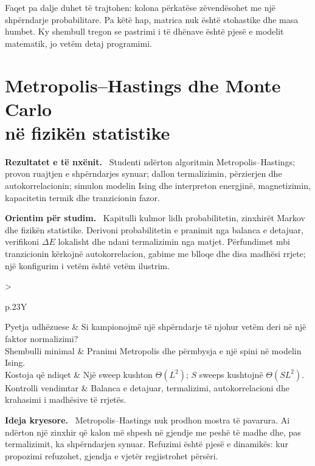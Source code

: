 \documentclass[11pt,oneside,openany]{book}
\newenvironment{qellime}{\par\medskip\noindent\textbf{Rezultatet e të nxënit.}\ }{\par\medskip}
\newenvironment{orientim}{\par\medskip\noindent\textbf{Orientim për studim.}\ }{\par\medskip}
\newenvironment{ideja}{\par\medskip\noindent\textbf{Ideja kryesore.}\ }{\par\medskip}
\newcommand{\hartakapitullit}[4]{%
\par\smallskip
\noindent\begin{tabularx}{\textwidth}{>{\bfseries\raggedright\arraybackslash}p{.23\textwidth}Y}
Pyetja udhëzuese & #1\\
Shembulli minimal & #2\\
Kostoja që ndiqet & #3\\
Kontrolli vendimtar & #4
\end{tabularx}\par\medskip}
\begin{document}
Faqet pa dalje duhet të trajtohen: kolona përkatëse zëvendësohet me një shpërndarje probabilitare. Pa këtë hap, matrica nuk është stohastike dhe masa humbet. Ky shembull tregon se pastrimi i të dhënave është pjesë e modelit matematik, jo vetëm detaj programimi.





\chapter[Metropolis--Hastings dhe Monte Carlo në fizikën statistike]{Metropolis--Hastings dhe Monte Carlo\\në fizikën statistike}
\begin{qellime}
Studenti ndërton algoritmin Metropolis--Hastings; provon ruajtjen e shpërndarjes synuar; dallon termalizimin, përzierjen dhe autokorrelacionin; simulon modelin Ising dhe interpreton energjinë, magnetizimin, kapacitetin termik dhe tranzicionin fazor.
\end{qellime}

\begin{orientim}
Kapitulli kulmor lidh probabilitetin, zinxhirët Markov dhe fizikën statistike.
Derivoni probabilitetin e pranimit nga balanca e detajuar, verifikoni
$\Delta E$ lokalisht dhe ndani termalizimin nga matjet. Përfundimet mbi
tranzicionin kërkojnë autokorrelacion, gabime me blloqe dhe disa madhësi
rrjete; një konfigurim i vetëm është vetëm ilustrim.
\end{orientim}

\hartakapitullit
{Si kampionojmë një shpërndarje të njohur vetëm deri në një faktor normalizimi?}
{Pranimi Metropolis dhe përmbysja e një spini në modelin Ising.}
{Një sweep kushton $\Theta(L^2)$; $S$ sweeps kushtojnë $\Theta(SL^2)$.}
{Balanca e detajuar, termalizimi, autokorrelacioni dhe krahasimi i madhësive të rrjetës.}

\begin{ideja}
Metropolis--Hastings nuk prodhon mostra të pavarura. Ai ndërton një zinxhir që
kalon më shpesh në gjendje me peshë të madhe dhe, pas termalizimit, ka
shpërndarjen synuar. Refuzimi është pjesë e dinamikës: kur propozimi refuzohet,
gjendja e vjetër regjistrohet përsëri.
\end{ideja}
\end{document}
